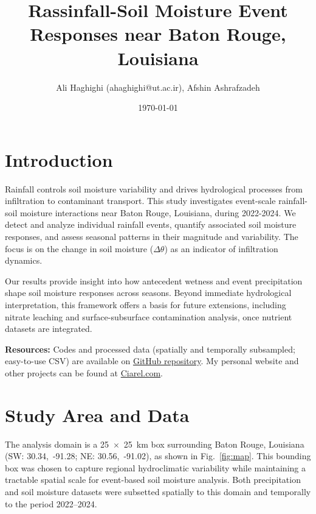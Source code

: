 \documentclass[8pt, twocolumn]{extarticle}
\title{Rassinfall-Soil Moisture Event Responses near Baton Rouge, Louisiana}
\author{%
  \large Ali Haghighi \normalsize{(ahaghighi@ut.ac.ir)}\large, Afshin Ashrafzadeh
}
\date{\large \today}
\makeatletter
\renewcommand{\maketitle}{\bgroup\setlength{\parindent}{0pt}
\begin{flushleft}
  \huge\textbf{\@title}

  \vspace{0.25cm}

  \normalsize\@author \hfill \normalsize\@date

  \vspace{0.25cm}\hrule\vspace{0.25cm}
\end{flushleft}
\egroup}
\makeatother
\begin{document}
\twocolumn[
  \begin{@twocolumnfalse}
    \maketitle
  \end{@twocolumnfalse}
]


\section{Introduction}

Rainfall controls soil moisture variability and drives hydrological processes from infiltration to contaminant transport. This study investigates event-scale rainfall-soil moisture interactions near Baton Rouge, Louisiana, during 2022-2024. We detect and analyze individual rainfall events, quantify associated soil moisture responses, and assess seasonal patterns in their magnitude and variability. The focus is on the change in soil moisture ($\Delta \theta$) as an indicator of infiltration dynamics.

Our results provide insight into how antecedent wetness and event precipitation shape soil moisture responses across seasons. Beyond immediate hydrological interpretation, this framework offers a basis for future extensions, including nitrate leaching and surface-subsurface contamination analysis, once nutrient datasets are integrated.

\textbf{Resources: }
Codes and processed data (spatially and temporally subsampled; easy-to-use CSV) are available on \href{https://github.com/Alioax/rainfall-soil-moisture/}{GitHub repository}. 
My personal website and other projects can be found at \href{https://ciarel.com}{Ciarel.com}.


\section{Study Area and Data}

The analysis domain is a 25~$\times$~25~km box surrounding Baton Rouge, Louisiana (SW: 30.34,~-91.28; NE: 30.56,~-91.02), as shown in Fig.~\ref{fig:map}. This bounding box was chosen to capture regional hydroclimatic variability while maintaining a tractable spatial scale for event-based soil moisture analysis. Both precipitation and soil moisture datasets were subsetted spatially to this domain and temporally to the period 2022--2024.
\end{document}
